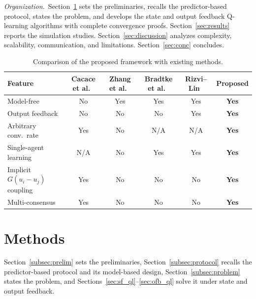 \documentclass[final,5p,times]{elsarticle}
\theoremstyle{plain}
\theoremstyle{definition}
\theoremstyle{remark}
\begin{document}
\emph{Organization.}\ Section~\ref{sec:methods} sets the preliminaries, recalls the predictor-based protocol, states the problem, and develops the state and output feedback Q-learning algorithms with complete convergence proofs. Section~\ref{sec:results} reports the simulation studies. Section~\ref{sec:discussion} analyzes complexity, scalability, communication, and limitations. Section~\ref{sec:conc} concludes.
\begin{table}[!t]
\centering
\caption{Comparison of the proposed framework with existing methods.}
\label{tab:comparison}
\small
\setlength{\tabcolsep}{6pt}
\begin{tabular}{lccccc}
\toprule
Feature & Cacace et al.~\cite{cacace2024} & Zhang et al.~\cite{zhang2011} & Bradtke et al.~\cite{bradtke1994} & Rizvi--Lin~\cite{rizvi2022} & \textbf{Proposed} \\
\midrule
Model-free & No & Yes & Yes & Yes & \textbf{Yes} \\
Output feedback & No & No & No & Yes & \textbf{Yes} \\
Arbitrary conv.\ rate & Yes & No & N/A & N/A & \textbf{Yes} \\
Single-agent learning & N/A & No & Yes & Yes & \textbf{Yes} \\
Implicit $G(u_i{-}u_j)$ coupling & Yes & No & No & No & \textbf{Yes} \\
Multi-consensus & Yes & No & No & No & \textbf{Yes} \\
\bottomrule
\end{tabular}
\end{table}
\section{Methods}
\label{sec:methods}
Section~\ref{subsec:prelim} sets the preliminaries, Section~\ref{subsec:protocol} recalls the predictor-based protocol and its model-based design, Section~\ref{subsec:problem} states the problem, and Sections~\ref{sec:sf_ql}--\ref{sec:ofb_ql} solve it under state and output feedback.
\end{document}
